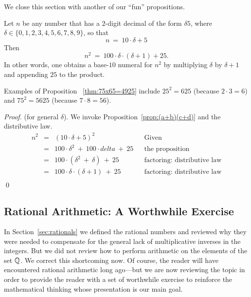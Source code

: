We close this section with another of our ``fun'' propositions.


\begin{prop}
\label{thm:75x65=4925}
Let $n$ be any number that has a $2$-digit decimal of the form $\delta
5$, where $\delta \in \{ 0,1,2,3,4,5,6,7,8,9 \}$,
so that
\[ n \ = \ 10 \cdot \delta + 5
\]
Then 
\[ n^2 \ = \ 100 \cdot \delta \cdot (\delta+1) + 25. \]
In other words, one obtains a base-$10$ numeral for $n^2$ by
multiplying $\delta$ by $\delta +1$ and appending $25$ to the product.
\end{prop}

\noindent
Examples of Proposition ~\ref{thm:75x65=4925} include
$25^2 = 625$ (because $2 \cdot 3 = 6$) and $75^2 = 5625$ (because $7
\cdot 8 = 56$).

\begin{proof} (for general $\delta$).
%
We invoke Proposition~\ref{prop:(a+b)(c+d)} and the distributive law.
\[
\begin{array}{lclll}
n^2 & = & (10 \cdot \delta + 5)^2 & & \mbox{Given} \\
    & = & 100 \cdot \delta^2 \ + \ 100 \cdot delta \ + \ 25
              & & \mbox{the proposition} \\
    & = & 100 \cdot (\delta^2 \ + \ \delta) \ + \ 25
              & & \mbox{factoring: distributive law} \\
    & = & 100 \cdot \delta \cdot (\delta + 1) \ + \ 25
              & & \mbox{factoring: distributive law} \\
\end{array}
\]
\qed
\end{proof}


\subsection{Rational Arithmetic: A Worthwhile Exercise}
\label{sec:Rational-arithmetic}

In Section~\ref{sec:rationals} we defined the rational numbers and
reviewed why they were needed to compensate for the general lack of
multiplicative inverses in the integers.  But we did not review how to
perform arithmetic on the elements of the set $\mathbb{Q}$.  We correct this
shortcoming now.  Of course, the reader will have encountered rational
arithmetic long ago---but we are now reviewing the topic in order to
provide the reader with a set of worthwhile exercise to reinforce the
mathematical thinking whose presentation is our main goal.

